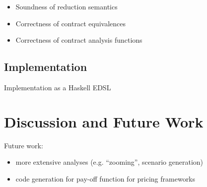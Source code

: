 \documentclass[a4paper,debug,twocolumn]{easychair}
\theoremstyle{plain}
\begin{document}
\begin{itemize}
\item Soundness of reduction semantics
\item Correctness of contract equivalences
\item Correctness of contract analysis functions
\end{itemize}


\subsection{Implementation}
\label{sec:implementation}

Implementation as a Haskell EDSL

\section{Discussion and Future Work}
\label{sec:disc-future-work}

Future work:
\begin{itemize}
\item more extensive analyses (e.g. ``zooming'', scenario generation)
\item code generation for pay-off function for pricing frameworks
\end{itemize}







\end{document}
